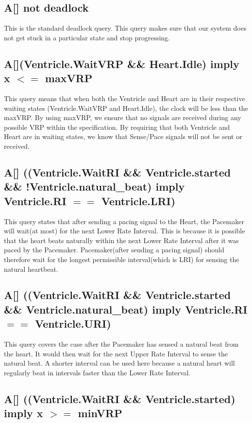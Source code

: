 \documentclass[10pt]{article}
\begin{document}
	\subsection{A[] not deadlock}
		This is the standard deadlock query. This query makes sure that our system does not get stuck in a particular state and stop progressing.


	\subsection{A[](Ventricle.WaitVRP \&\& Heart.Idle) imply x $<=$ maxVRP}

		This query means that when both the Ventricle and Heart are in their respective waiting states (Ventricle.WaitVRP and Heart.Idle), the clock will be less than the maxVRP. By using maxVRP, we ensure that no signals are received during any possible VRP within the specification. By requiring that both Ventricle and Heart are in waiting states, we know that Sense/Pace signals will not be sent or received.

	\subsection{A[] ((Ventricle.WaitRI \&\& Ventricle.started \&\& !Ventricle.natural\_beat) imply Ventricle.RI $==$ Ventricle.LRI)}

		This query states that after sending a pacing signal to the Heart, the Pacemaker will wait(at most) for the next Lower Rate Interval. This is because it is possible that the heart beats naturally within the next Lower Rate Interval after it was paced by the Pacemaker. Pacemaker(after sending a pacing signal) should therefore wait for the longest permissible interval(which is LRI) for sensing the natural heartbeat.

	\subsection{A[] ((Ventricle.WaitRI \&\& Ventricle.started \&\& Ventricle.natural\_beat) imply Ventricle.RI $==$ Ventricle.URI)}

		This query covers the case after the Pacemaker has sensed a natural beat from the heart. It would then wait for the next Upper Rate Interval to sense the natural beat. A shorter interval can be used here because a natural heart will regularly beat in intervals faster than the Lower Rate Interval.

	\subsection{A[] ((Ventricle.WaitRI \&\& Ventricle.started) imply x $>=$ minVRP}
\end{document}

